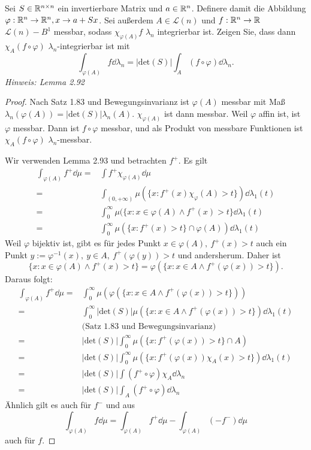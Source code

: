 \begin{Problem}
	Sei $S\in \mathbb{R}^{n\times n}$ ein invertierbare Matrix und $a\in \mathbb{R}^n$. Definere damit die Abbildung $\varphi:\mathbb{R}^n\to \mathbb{R}^n, x\to a+Sx$. Sei außerdem $A\in \mathcal{L}(n)$ und $f:\mathbb{R}^n\to \mathbb{R}$ $\mathcal{L}(n)-B^1$ messbar, sodass $\chi_{\varphi(A)}f$ $\lambda_n$ integrierbar ist. Zeigen Sie, dass dann $\chi_A(f\circ \varphi)$ $\lambda_n$-integrierbar ist mit
	\[
		\int_{\varphi(A)}f\dd{\lambda_n}=|\text{det}(S)|\int_A (f\circ\varphi) \dd{\lambda_n}
	.\] 
	{\footnotesize \emph{Hinweis: Lemma 2.92}}
\end{Problem}
\begin{proof}
	Nach Satz 1.83 und Bewegungsinvarianz ist $\varphi(A)$ messbar mit Maß $\lambda_n(\varphi(A))=|\text{det}(S)|\lambda_n(A)$. $\chi_{\varphi(A)}$ ist dann messbar. Weil $\varphi$ affin ist, ist $\varphi$ messbar. Dann ist $f\circ\varphi$ messbar, und als Produkt von messbare Funktionen ist $\chi_A(f\circ \varphi)$ $\lambda_n$-messbar.

	Wir verwenden Lemma 2.93 und betrachten $f^+$. Es gilt
	\begin{align*}
		\int_{\varphi(A)}f^+\dd{\mu}=&\int f^+\chi_{\varphi(A)}\dd{\mu}\\
		=&\int_{(0,+\infty)}\mu(\{x:f^+(x)\chi_{\varphi}(A)>t\})\dd{\lambda_1(t)}\\
		=&\int_0^\infty \mu(\{x:x\in \varphi(A)\wedge f^+(x)>t\} \dd{\lambda_1(t)}\\
		=&\int_0^\infty\mu(\{x:f^+(x)>t\} \cap \varphi(A))\dd{\lambda_1(t)}
	\end{align*}
	Weil $\varphi$ bijektiv ist, gibt es f\"{u}r jedes Punkt  $x\in\varphi(A),~f^+(x)>t$ auch ein Punkt $y:=\varphi^{-1}(x),~y\in A,~f^+(\varphi(y))>t$ und andersherum. Daher ist 
	\[
	\{x:x\in \varphi(A)\wedge f^+(x)>t\} =\varphi(\{x:x\in A\wedge f^+(\varphi(x))>t\})
	.\] 
	Daraus folgt:
	\begin{align*}
		\int_{\varphi(A)}f^+\dd{\mu}=&\int_0^\infty \mu(\varphi(\{x:x\in A\wedge f^+(\varphi(x))>t\} ))\\
		=&\int_0^\infty|\text{det}(S)|\mu(\{x:x\in A\wedge f^+(\varphi(x))>t\})\dd{\lambda_1(t)}  \\
		&\text{(Satz 1.83 und Bewegungsinvarianz)}\\
		=&|\text{det}(S)|\int_0^\infty \mu(\{x:f^+(\varphi(x))>t\}\cap A)\\
		=&|\text{det}(S)|\int_0^\infty \mu(\{x:f^+(\varphi(x))\chi_A(x)>t\} )\dd{\lambda_1(t)}\\
		=&|\text{det}(S)|\int (f^+\circ\varphi)\chi_A\dd{\lambda_n}\\
		=&|\text{det}(S)|\int_A (f^+\circ\varphi)\dd{\lambda_n}
	\end{align*}
	Ähnlich gilt es auch für $f^-$ und aus
	\[
	\int_{\varphi(A)}f\dd{\mu}=\int_{\varphi(A)} f^+\dd{\mu}-\int_{\varphi(A)}(-f^-)\dd{\mu}
	\]
	auch für $f$.
\end{proof}

